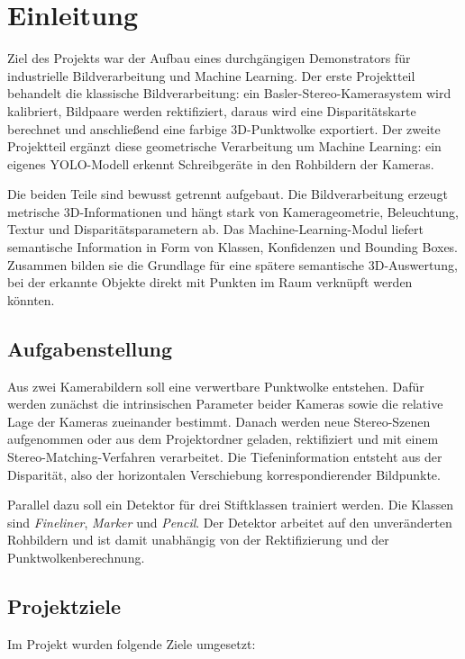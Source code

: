 \chapter{Einleitung}

Ziel des Projekts war der Aufbau eines durchgängigen Demonstrators für industrielle
Bildverarbeitung und Machine Learning. Der erste Projektteil behandelt die klassische
Bildverarbeitung: ein Basler-Stereo-Kamerasystem wird kalibriert, Bildpaare werden
rektifiziert, daraus wird eine Disparitätskarte berechnet und anschließend eine farbige
3D-Punktwolke exportiert. Der zweite Projektteil ergänzt diese geometrische Verarbeitung um
Machine Learning: ein eigenes YOLO-Modell erkennt Schreibgeräte in den Rohbildern der
Kameras.

Die beiden Teile sind bewusst getrennt aufgebaut. Die Bildverarbeitung erzeugt metrische
3D-Informationen und hängt stark von Kamerageometrie, Beleuchtung, Textur und
Disparitätsparametern ab. Das Machine-Learning-Modul liefert semantische Information in Form
von Klassen, Konfidenzen und Bounding Boxes. Zusammen bilden sie die Grundlage für eine
spätere semantische 3D-Auswertung, bei der erkannte Objekte direkt mit Punkten im Raum
verknüpft werden könnten.

\section{Aufgabenstellung}

Aus zwei Kamerabildern soll eine verwertbare Punktwolke entstehen. Dafür werden zunächst die
intrinsischen Parameter beider Kameras sowie die relative Lage der Kameras zueinander
bestimmt. Danach werden neue Stereo-Szenen aufgenommen oder aus dem Projektordner geladen,
rektifiziert und mit einem Stereo-Matching-Verfahren verarbeitet. Die Tiefeninformation
entsteht aus der Disparität, also der horizontalen Verschiebung korrespondierender Bildpunkte.

Parallel dazu soll ein Detektor für drei Stiftklassen trainiert werden. Die Klassen sind
\textit{Fineliner}, \textit{Marker} und \textit{Pencil}. Der Detektor arbeitet auf den
unveränderten Rohbildern und ist damit unabhängig von der Rektifizierung und der
Punktwolkenberechnung.

\section{Projektziele}

Im Projekt wurden folgende Ziele umgesetzt:

